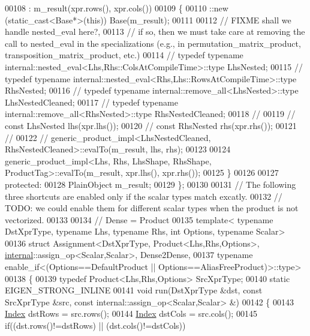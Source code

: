 \begin{DoxyCode}
00108     : m\_result(xpr.rows(), xpr.cols())
00109   \{
00110     ::new (static\_cast<Base*>(\textcolor{keyword}{this})) Base(m\_result);
00111     
00112 \textcolor{comment}{// FIXME shall we handle nested\_eval here?,}
00113 \textcolor{comment}{// if so, then we must take care at removing the call to nested\_eval in the specializations (e.g., in
       permutation\_matrix\_product, transposition\_matrix\_product, etc.)}
00114 \textcolor{comment}{//     typedef typename internal::nested\_eval<Lhs,Rhs::ColsAtCompileTime>::type LhsNested;}
00115 \textcolor{comment}{//     typedef typename internal::nested\_eval<Rhs,Lhs::RowsAtCompileTime>::type RhsNested;}
00116 \textcolor{comment}{//     typedef typename internal::remove\_all<LhsNested>::type LhsNestedCleaned;}
00117 \textcolor{comment}{//     typedef typename internal::remove\_all<RhsNested>::type RhsNestedCleaned;}
00118 \textcolor{comment}{//     }
00119 \textcolor{comment}{//     const LhsNested lhs(xpr.lhs());}
00120 \textcolor{comment}{//     const RhsNested rhs(xpr.rhs());}
00121 \textcolor{comment}{//   }
00122 \textcolor{comment}{//     generic\_product\_impl<LhsNestedCleaned, RhsNestedCleaned>::evalTo(m\_result, lhs, rhs);}
00123 
00124     generic\_product\_impl<Lhs, Rhs, LhsShape, RhsShape, ProductTag>::evalTo(m\_result, xpr.lhs(), xpr.rhs());
00125   \}
00126   
00127 protected:  
00128   PlainObject m\_result;
00129 \};
00130 
00131 \textcolor{comment}{// The following three shortcuts are enabled only if the scalar types match excatly.}
00132 \textcolor{comment}{// TODO: we could enable them for different scalar types when the product is not vectorized.}
00133 
00134 \textcolor{comment}{// Dense = Product}
00135 template< typename DstXprType, typename Lhs, typename Rhs, \textcolor{keywordtype}{int} Options, typename Scalar>
00136 struct Assignment<DstXprType, Product<Lhs,Rhs,Options>, \hyperlink{namespaceinternal}{internal}::assign\_op<Scalar,Scalar>, 
      Dense2Dense,
00137   typename enable\_if<(Options==DefaultProduct || Options==AliasFreeProduct)>::type>
00138 \{
00139   \textcolor{keyword}{typedef} Product<Lhs,Rhs,Options> SrcXprType;
00140   \textcolor{keyword}{static} EIGEN\_STRONG\_INLINE
00141   \textcolor{keywordtype}{void} run(DstXprType &dst, \textcolor{keyword}{const} SrcXprType &src, \textcolor{keyword}{const} internal::assign\_op<Scalar,Scalar> &)
00142   \{
00143     \hyperlink{namespace_eigen_a62e77e0933482dafde8fe197d9a2cfde}{Index} dstRows = src.rows();
00144     \hyperlink{namespace_eigen_a62e77e0933482dafde8fe197d9a2cfde}{Index} dstCols = src.cols();
00145     \textcolor{keywordflow}{if}((dst.rows()!=dstRows) || (dst.cols()!=dstCols))

\end{DoxyCode}
